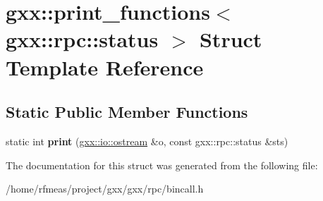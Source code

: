 \hypertarget{structgxx_1_1print__functions_3_01gxx_1_1rpc_1_1status_01_4}{}\section{gxx\+:\+:print\+\_\+functions$<$ gxx\+:\+:rpc\+:\+:status $>$ Struct Template Reference}
\label{structgxx_1_1print__functions_3_01gxx_1_1rpc_1_1status_01_4}
\subsection*{Static Public Member Functions}
\begin{DoxyCompactItemize}
\item 
static int {\bfseries print} (\hyperlink{classgxx_1_1io_1_1ostream}{gxx\+::io\+::ostream} \&o, const gxx\+::rpc\+::status \&sts)\hypertarget{structgxx_1_1print__functions_3_01gxx_1_1rpc_1_1status_01_4_a2f2342db8c9a7493d67f817281182bf2}{}\label{structgxx_1_1print__functions_3_01gxx_1_1rpc_1_1status_01_4_a2f2342db8c9a7493d67f817281182bf2}

\end{DoxyCompactItemize}


The documentation for this struct was generated from the following file\+:\begin{DoxyCompactItemize}
\item 
/home/rfmeas/project/gxx/gxx/rpc/bincall.\+h\end{DoxyCompactItemize}
